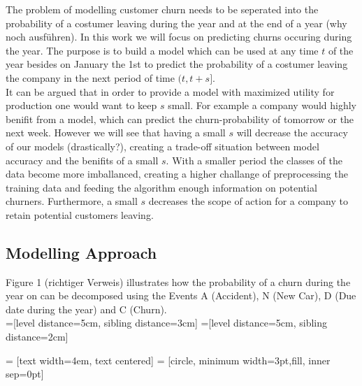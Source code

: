\documentclass[12pt,titlepage]{article}
\begin{document}
The problem of modelling customer churn needs to be seperated into the probability of a costumer leaving during the
year and at the end of a year (why noch ausführen). In this work we will focus on predicting churns occuring during the year.
The purpose is to build a model which can be used at any time $t$ of the year besides on January the 1st to predict the probability of
a costumer leaving the company in the next period of time $(t, t+s]$. \\
It can be argued that in order to provide a model with maximized utility for production one would want to keep $s$ small. For example
a company would highly benifit from a model, which can predict the churn-probability of tomorrow or the next week. However we will see that
having a small $s$ will decrease the accuracy of our models (drastically?), creating a trade-off situation between model accuracy and the benifits
of a small $s$. With a smaller period the classes of the data become more imballanced, creating a higher challange of preprocessing the training
data and feeding the algorithm enough information on potential churners. Furthermore, a small $s$ decreases the scope of action for a company to
retain potential customers leaving. \\

\subsection{Modelling Approach} \par

Figure 1 (richtiger Verweis) illustrates how the probability of a churn during the year on can be decomposed using the Events A (Accident), N
(New Car), D (Due date during the year) and C (Churn). \\

=[level distance=5cm, sibling distance=3cm]
=[level distance=5cm, sibling distance=2cm]

 = [text width=4em, text centered]
 = [circle, minimum width=3pt,fill, inner sep=0pt]
\end{document}
